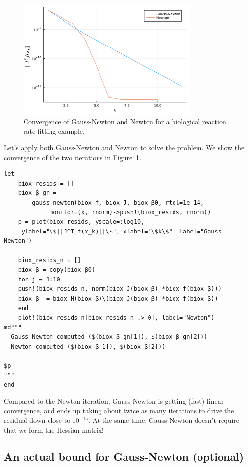 \documentclass[12pt, leqno]{article} %
\begin{document}
\begin{figure}
\begin{center}
  \includegraphics[width=0.8\textwidth]{fig/2023-04-10-biox-cvg.pdf}
\end{center}
\caption{Convergence of Gauss-Newton and Newton for a biological reaction
  rate fitting example.}
\label{fig:biox-cvg}
\end{figure}

Let's apply both Gauss-Newton and Newton to solve the problem.
We show the convergence of the two iterations in Figure~\ref{fig:biox-cvg}.

\begin{verbatim}
let
    biox_resids = []
    biox_β_gn =
        gauss_newton(biox_f, biox_J, biox_β0, rtol=1e-14, 
		     monitor=(x, rnorm)->push!(biox_resids, rnorm))
    p = plot(biox_resids, yscale=:log10,
	 ylabel="\$||J^T f(x_k)||\$", xlabel="\$k\$", label="Gauss-Newton")

    biox_resids_n = []
    biox_β = copy(biox_β0)
    for j = 1:10
	push!(biox_resids_n, norm(biox_J(biox_β)'*biox_f(biox_β)))
	biox_β -= biox_H(biox_β)\(biox_J(biox_β)'*biox_f(biox_β))
    end
    plot!(biox_resids_n[biox_resids_n .> 0], label="Newton")
md"""
- Gauss-Newton computed ($(biox_β_gn[1]), $(biox_β_gn[2]))
- Newton computed ($(biox_β[1]), $(biox_β[2]))

$p
"""
end
\end{verbatim}

Compared to the Newton iteration, Gauss-Newton is getting (fast) linear
convergence, and ends up taking about twice as many iterations to drive
the residual down close to \(10^{-15}\). At the same time, Gauss-Newton
doesn't require that we form the Hessian matrix!

\subsection{An actual bound for Gauss-Newton (optional)}
\end{document}
